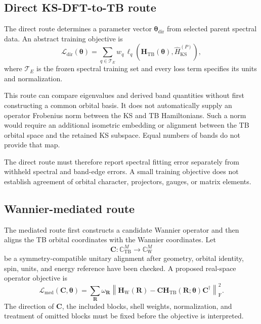 \subsection*{Direct KS-DFT-to-TB route}

The direct route determines a parameter vector
$\boldsymbol\theta_{\mathrm{dir}}$ from selected parent spectral data. An
abstract training objective is
\begin{equation}
    \mathcal L_{\mathrm{dir}}(\boldsymbol\theta)
    =
    \sum_{q\in\mathcal T_E}
    w_q\,
    \ell_q
    \left(
        \mathbf H_{\mathrm{TB}}(\boldsymbol\theta),
        \hat H_{\mathrm{KS}}^{(P)}
    \right),
\end{equation}
where $\mathcal T_E$ is the frozen spectral training set and every loss term
specifies its units and normalization.

This route can compare eigenvalues and derived band quantities without first
constructing a common orbital basis. It does not automatically supply an
operator Frobenius norm between the KS and TB Hamiltonians. Such a norm would
require an additional isometric embedding or alignment between the TB orbital
space and the retained KS subspace. Equal numbers of bands do not provide that
map.

The direct route must therefore report spectral fitting error separately from
withheld spectral and band-edge errors. A small training objective does not
establish agreement of orbital character, projectors, gauges, or matrix
elements.

\subsection*{Wannier-mediated route}

The mediated route first constructs a candidate Wannier operator and then
aligns the TB orbital coordinates with the Wannier coordinates. Let
\begin{equation}
    \mathbf C:
    \mathbb C^M_{\mathrm{TB}}
    \longrightarrow
    \mathbb C^M_{\mathrm W}
\end{equation}
be a symmetry-compatible unitary alignment after geometry, orbital identity,
spin, units, and energy reference have been checked. A proposed real-space
operator objective is
\begin{equation}
    \mathcal L_{\mathrm{med}}
    (\mathbf C,\boldsymbol\theta)
    =
    \sum_{\mathbf R}
    \omega_{\mathbf R}
    \left\lVert
        \mathbf H_{\mathrm W}(\mathbf R)
        -
        \mathbf C
        \mathbf H_{\mathrm{TB}}(\mathbf R;\boldsymbol\theta)
        \mathbf C^\dagger
    \right\rVert_{\mathrm F}^2.
\end{equation}
The direction of $\mathbf C$, the included blocks, shell weights,
normalization, and treatment of omitted blocks must be fixed before the
objective is interpreted.

